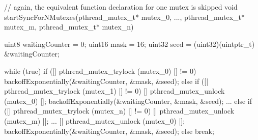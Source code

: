 \begin{ccode}
// again, the equivalent function declaration for one mutex is skipped
void startSyncForNMutexes(pthread_mutex_t* mutex_0, ..., pthread_mutex_t* mutex_m, pthread_mutex_t* mutex_n) { 
  uint8 waitingCounter = 0; 
  uint16 mask = 16; 
  uint32 seed = (uint32)(uintptr_t) &waitingCounter;
  
  while (true) { 
    if ([| pthread_mutex_trylock (mutex_0) |] != 0) { 
      backoffExponentially(&waitingCounter, &mask, &seed); 
    } 
    else if ([| pthread_mutex_trylock (mutex_1) |] != 0) { 
      [| pthread_mutex_unlock (mutex_0) |]; 
      backoffExponentially(&waitingCounter, &mask, &seed); 
    } ...
    else if ([| pthread_mutex_trylock (mutex_n) |] != 0) { 
      [| pthread_mutex_unlock (mutex_m) |];
      ...
      [| pthread_mutex_unlock (mutex_0) |]; 
      backoffExponentially(&waitingCounter, &mask, &seed); 
    } 
    else { 
      break; 
    } 
  }
}
\end{ccode}

